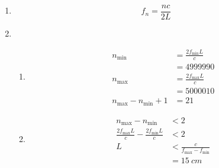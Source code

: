 \documentclass{article}
\begin{document}
\begin{enumerate}
  \item \[f_n = \frac{n c}{2 L}\]

  \item

        \begin{enumerate}
          \item

                \begin{align*}
                  n_\text{min}                    & = \frac{2 f_\text{min} L}{c} \\
                                                  & = \num{4999990}              \\
                  n_\text{max}                    & = \frac{2 f_\text{max} L}{c} \\
                                                  & = \num{5000010}              \\
                  n_\text{max} - n_\text{min} + 1 & = 21
                \end{align*}

          \item

                \begin{align*}
                  n_\text{max} - n_\text{min}                             & < 2                                     \\
                  \frac{2 f_\text{max} L}{c} - \frac{2 f_\text{min} L}{c} & < 2                                     \\
                  L                                                       & < \frac{c}{f_\text{max} - f_\text{min}} \\
                                                                          & = \qty{15}{cm}
                \end{align*}
        \end{enumerate}
\end{enumerate}

\subsection{}
\end{document}
